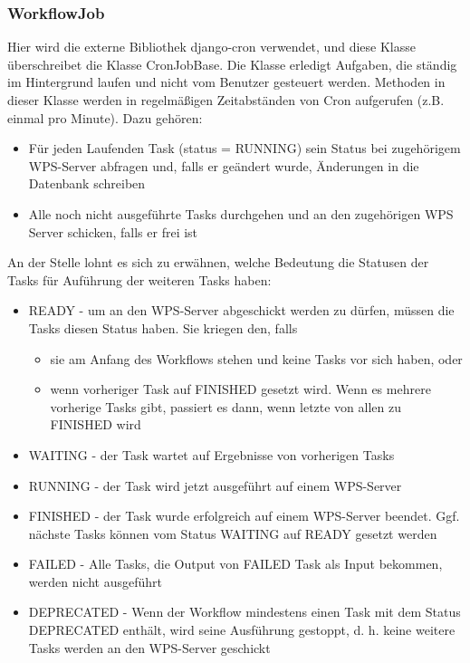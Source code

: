 		\subsubsection{WorkflowJob}
		
	Hier wird die externe Bibliothek django-cron verwendet, und diese Klasse überschreibet die Klasse CronJobBase.\newline
		Die Klasse erledigt Aufgaben, die ständig im Hintergrund laufen und nicht vom Benutzer gesteuert werden. Methoden in dieser Klasse werden in regelmäßigen Zeitabständen von \gls{Cron} aufgerufen (z.B. einmal pro Minute). Dazu gehören:
		\begin{itemize}
			\item Für jeden Laufenden Task (status = RUNNING) sein Status bei zugehörigem WPS-Server abfragen und, falls er geändert wurde, Änderungen in die Datenbank schreiben
			\item Alle noch nicht ausgeführte Tasks durchgehen und an den zugehörigen WPS Server schicken, falls er frei ist
		\end{itemize}
		
		An der Stelle lohnt es sich zu erwähnen, welche Bedeutung die Statusen der Tasks für Auführung der weiteren Tasks haben:
		
		\begin{itemize}
			\item READY - um an den WPS-Server abgeschickt werden zu dürfen, müssen die Tasks diesen Status haben. Sie kriegen den, falls
			\begin{itemize}
				\item sie am Anfang des Workflows stehen und keine Tasks vor sich haben, oder
				\item wenn vorheriger Task auf FINISHED gesetzt wird. Wenn es mehrere vorherige Tasks gibt, passiert es dann, wenn letzte von allen zu FINISHED wird
			\end{itemize}
			\item WAITING - der Task wartet auf Ergebnisse von vorherigen Tasks
			\item RUNNING - der Task wird jetzt ausgeführt auf einem WPS-Server
			\item FINISHED - der Task wurde erfolgreich auf einem WPS-Server beendet. Ggf. nächste Tasks können vom Status WAITING auf READY gesetzt werden
			\item FAILED - Alle Tasks, die Output von FAILED Task als Input bekommen, werden nicht ausgeführt
			\item DEPRECATED - Wenn der Workflow mindestens einen Task mit dem Status DEPRECATED enthält, wird seine Ausführung gestoppt, d. h. keine weitere Tasks werden an den WPS-Server geschickt
		\end{itemize}
		
